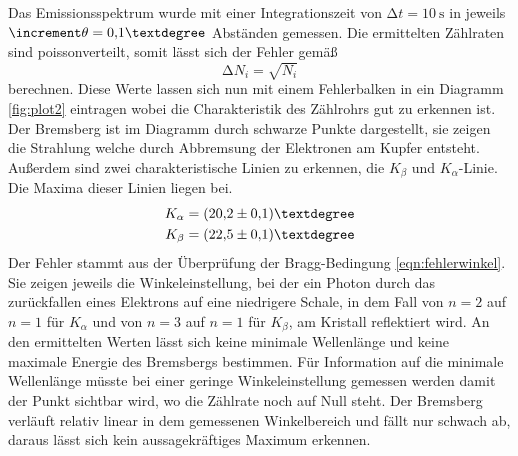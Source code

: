 Das Emissionsspektrum wurde mit einer Integrationszeit von $\increment t = \SI{10}{\second}$ in jeweils $\increment \theta = 0{,}1\textdegree$ Abständen gemessen.
Die ermittelten Zählraten sind poissonverteilt, somit lässt sich der Fehler gemäß
\begin{equation*}
\increment N_{i} = \sqrt{N_{i}}
\end{equation*}
berechnen. Diese Werte lassen sich nun mit einem Fehlerbalken in ein Diagramm \ref{fig:plot2} eintragen wobei die Charakteristik des Zählrohrs gut zu erkennen ist.
Der Bremsberg ist im Diagramm durch schwarze Punkte dargestellt, sie zeigen die Strahlung welche durch Abbremsung der Elektronen am Kupfer entsteht. 
Außerdem sind zwei charakteristische Linien zu erkennen, die $K_{\beta}$ und $K_{\alpha}$-Linie. 
Die Maxima dieser Linien liegen bei.
\begin{align*}
K_{\alpha} &= (20{,}2 \pm 0{,}1)\textdegree \\
K_{\beta} &= (22{,}5 \pm 0{,}1)\textdegree
\end{align*}
Der Fehler stammt aus der Überprüfung der Bragg-Bedingung \eqref{eqn:fehlerwinkel}.
Sie zeigen jeweils die Winkeleinstellung, bei der ein Photon durch das zurückfallen eines Elektrons auf eine
niedrigere Schale, in dem Fall von $n=2$ auf $n=1$ für $K_{\alpha}$ und von $n=3$ auf $n=1$ für $K_{\beta}$, am Kristall reflektiert wird. 
An den ermittelten Werten lässt sich keine minimale Wellenlänge und keine maximale Energie des Bremsbergs bestimmen. Für Information auf die minimale Wellenlänge müsste bei einer geringe Winkeleinstellung
gemessen werden damit der Punkt sichtbar wird, wo die Zählrate noch auf Null steht. Der Bremsberg verläuft relativ linear in dem gemessenen Winkelbereich und fällt nur schwach ab, daraus lässt sich kein
aussagekräftiges Maximum erkennen. 
